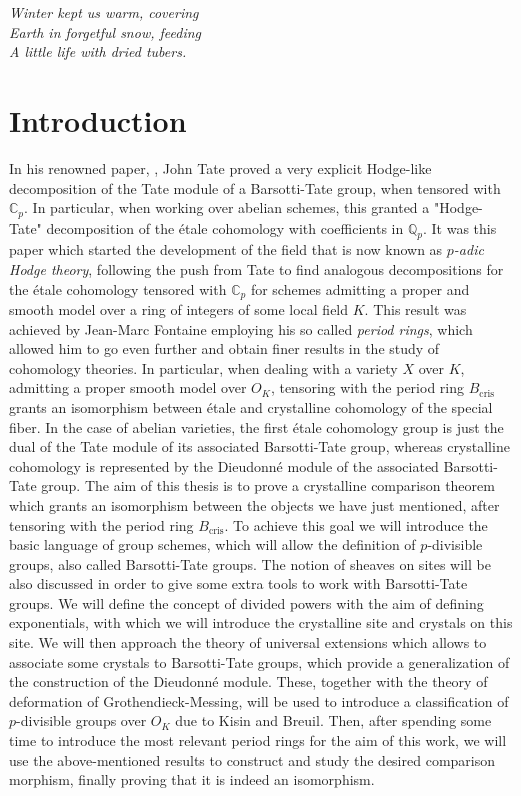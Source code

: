 \begin{flushright}
	\emph{Winter kept us warm, covering\\
	Earth in forgetful snow, feeding\\
	A little life with dried tubers.}\\
\end{flushright} 
\newpage

{}
\section*{Introduction}
In his renowned paper, \cite{TatePC}, John Tate proved a very explicit Hodge-like decomposition
of the Tate module of a Barsotti-Tate group, when tensored with $\mathbb{C}_p$.
In particular, when working over abelian schemes, this granted a "Hodge-Tate"
decomposition of the étale cohomology with coefficients in $\mathbb{Q}_p$.
It was this paper which started the development of the field that is now known as \emph{$p$-adic Hodge theory},
following the push from Tate to find analogous decompositions for the étale cohomology
tensored with $\mathbb{C}_p$ for schemes admitting a proper and smooth model over
a ring of integers of some local field $K$.
This result was achieved by Jean-Marc Fontaine employing his so called \emph{period rings},
which allowed him to go even further and obtain finer results in the
study of cohomology theories.
In particular, when dealing with a variety $X$ over $K$, admitting
a proper smooth model over $O_K$, tensoring with the period ring $B_{\mathrm{cris}}$
grants an isomorphism between étale and crystalline cohomology of the special fiber.
In the case of abelian varieties, the first étale cohomology group is just the dual
of the Tate module of its associated Barsotti-Tate group,
whereas crystalline cohomology is represented by the Dieudonné module
of the associated Barsotti-Tate group.
The aim of this thesis is to prove a crystalline comparison theorem which
grants an isomorphism between the objects we have just mentioned, after tensoring
with the period ring $B_{\mathrm{cris}}$.
To achieve this goal we will introduce the basic language of group schemes, which
will allow the definition of $p$-divisible groups, also called Barsotti-Tate groups.
The notion of sheaves on sites will be also discussed in order to give some
extra tools to work with Barsotti-Tate groups.
We will define the concept of divided powers with the aim
of defining exponentials, with which we will introduce
the crystalline site and crystals on this site.
We will then approach the theory of universal extensions which allows
to associate some crystals to Barsotti-Tate groups,
which provide a generalization of the construction of the Dieudonné module.
These, together with the theory of deformation of Grothendieck-Messing,
will be used to introduce a classification
of $p$-divisible groups over $O_K$ due to Kisin and Breuil.
Then, after spending some time to introduce the most relevant period rings
for the aim of this work, we will use the above-mentioned results
to construct and study the desired comparison morphism,
finally proving that it is indeed an isomorphism.




